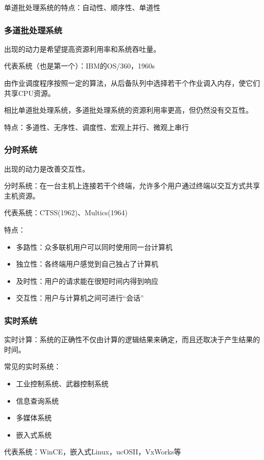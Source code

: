 \documentclass[12pt, a4paper, oneside]{ctexart}
\begin{document}
单道批处理系统的特点：自动性、顺序性、单道性

\subsubsection{多道批处理系统}

出现的动力是希望提高资源利用率和系统吞吐量。

代表系统（也是第一个）：IBM的OS/360，1960s

由作业调度程序按照一定的算法，从后备队列中选择若干个作业调入内存，使它们共享CPU资源。

相比单道批处理系统，多道批处理系统的资源利用率更高，但仍然没有交互性。

特点：多道性、无序性、调度性、宏观上并行、微观上串行

\subsubsection{分时系统}

出现的动力是改善交互性。

分时系统：在一台主机上连接若干个终端，允许多个用户通过终端以交互方式共享主机资源。

代表系统：CTSS(1962)、Multics(1964)

特点：
\begin{itemize}
  \item 多路性：众多联机用户可以同时使用同一台计算机
  \item 独立性：各终端用户感觉到自己独占了计算机
  \item 及时性：用户的请求能在很短时间内得到响应
  \item 交互性：用户与计算机之间可进行“会话”
\end{itemize}

\subsubsection{实时系统}

实时计算：系统的正确性不仅由计算的逻辑结果来确定，而且还取决于产生结果的时间。

常见的实时系统：
\begin{itemize}
  \item 工业控制系统、武器控制系统
  \item 信息查询系统
  \item 多媒体系统
  \item 嵌入式系统
\end{itemize}

代表系统：WinCE，嵌入式Linux，ucOSII，VxWorks等
\end{document}
